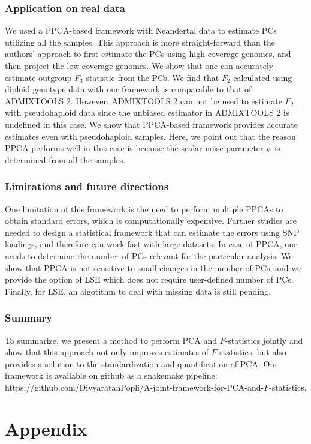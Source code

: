 \documentclass[12pt]{article}
\begin{document}
\subsubsection{Application on real data}
We used a PPCA-based framework with Neandertal data to estimate PCs utilizing all the samples. This approach is more straight-forward than the authors' approach to first estimate the PCs using high-coverage genomes, and then project the low-coverage genomes. We show that one can accurately estimate outgroup $F_3$ statistic from the PCs. We find that $F_2$ calculated using diploid genotype data with our framework is comparable to that of ADMIXTOOLS 2. However, ADMIXTOOLS 2 can not be used to estimate $F_2$ with pseudohaploid data since the unbiased estimator in ADMIXTOOLS 2 is undefined in this case. We show that PPCA-based framework provides accurate estimates even with pseudohaploid samples. Here, we point out that the reason PPCA performs well in this case is because the scalar noise parameter $\psi$ is determined from all the samples.

\subsubsection{Limitations and future directions}
One limitation of this framework is the need to perform multiple PPCAs to obtain standard errors, which is computationally expensive. Further studies are needed to design a statistical framework that can estimate the errors using SNP loadings, and therefore can work fast with large datasets. In case of PPCA, one needs to determine the number of PCs relevant for the particular analysis. We show that PPCA is not sensitive to small changes in the number of PCs, and we provide the option of LSE which does not require user-defined number of PCs. Finally, for LSE, an algotithm to deal with missing data is still pending. 

\subsubsection{Summary}
To summarize, we present a method to perform PCA and $F$-statistics jointly and show that this approach not only improves estimates of $F$-statistics, but also provides a solution to the standardization and quantification of PCA. Our framework is available on github as a snakemake pipeline: https://github.com/DivyaratanPopli/A-joint-framework-for-PCA-and-$F$-statistics.

\section{Appendix}\label{appendix}
\end{document}
